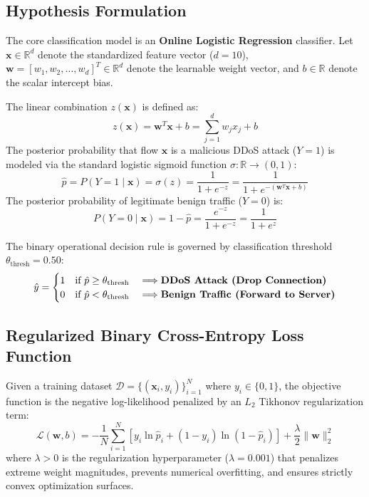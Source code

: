 \documentclass[12pt,a4paper,oneside]{report}
\begin{document}
\subsection{Hypothesis Formulation}
The core classification model is an \textbf{Online Logistic Regression} classifier. Let $\mathbf{x} \in \mathbb{R}^d$ denote the standardized feature vector ($d=10$), $\mathbf{w} = [w_1, w_2, \dots, w_d]^T \in \mathbb{R}^d$ denote the learnable weight vector, and $b \in \mathbb{R}$ denote the scalar intercept bias.

The linear combination $z(\mathbf{x})$ is defined as:
\begin{equation}
z(\mathbf{x}) = \mathbf{w}^T \mathbf{x} + b = \sum_{j=1}^d w_j x_j + b
\end{equation}
The posterior probability that flow $\mathbf{x}$ is a malicious DDoS attack ($Y = 1$) is modeled via the standard logistic sigmoid function $\sigma: \mathbb{R} \to (0, 1)$:
\begin{equation}
\hat{p} = P(Y = 1 \mid \mathbf{x}) = \sigma(z) = \frac{1}{1 + e^{-z}} = \frac{1}{1 + e^{-(\mathbf{w}^T \mathbf{x} + b)}}
\end{equation}
The posterior probability of legitimate benign traffic ($Y = 0$) is:
\begin{equation}
P(Y = 0 \mid \mathbf{x}) = 1 - \hat{p} = \frac{e^{-z}}{1 + e^{-z}} = \frac{1}{1 + e^z}
\end{equation}

The binary operational decision rule is governed by classification threshold $\theta_{\text{thresh}} = 0.50$:
\begin{equation}
\hat{y} = \begin{cases}
1 & \text{if } \hat{p} \ge \theta_{\text{thresh}} \quad \Longrightarrow \text{\textbf{DDoS Attack (Drop Connection)}} \\
0 & \text{if } \hat{p} < \theta_{\text{thresh}} \quad \Longrightarrow \text{\textbf{Benign Traffic (Forward to Server)}}
\end{cases}
\end{equation}

\subsection{Regularized Binary Cross-Entropy Loss Function}
Given a training dataset $\mathcal{D} = \{(\mathbf{x}_i, y_i)\}_{i=1}^N$ where $y_i \in \{0, 1\}$, the objective function is the negative log-likelihood penalized by an $L_2$ Tikhonov regularization term:
\begin{equation}
\mathcal{L}(\mathbf{w}, b) = -\frac{1}{N} \sum_{i=1}^N \left[ y_i \ln \hat{p}_i + (1 - y_i) \ln (1 - \hat{p}_i) \right] + \frac{\lambda}{2} \|\mathbf{w}\|_2^2
\label{eq:loss_func}
\end{equation}
where $\lambda > 0$ is the regularization hyperparameter ($\lambda = 0.001$) that penalizes extreme weight magnitudes, prevents numerical overfitting, and ensures strictly convex optimization surfaces.
\end{document}
